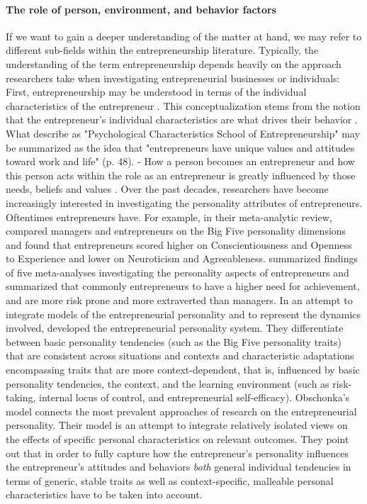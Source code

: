 \documentclass[a4paper,man,noextraspace,natbib]{apa6}
\begin{document}
\paragraph{The role of person, environment, and behavior factors}
If we want to gain a deeper understanding of the matter at hand, we may refer to different sub-fields within the entrepreneurship literature. 
Typically, the understanding of the term entrepreneurship depends heavily on the approach researchers take when investigating entrepreneurial businesses or individuals: 
First, entrepreneurship may be understood in terms of the individual characteristics of the entrepreneur \citep{Bird1988, Rauch2007, Obschonka2017}. 
This conceptualization stems from the notion that the entrepreneur's individual characteristics are what drives their behavior \citep{Cunningham1991}. 
What \cite{Cunningham1991} describe as "Psychological Characteristics School of Entrepreneurship" may be summarized as the idea that "entrepreneurs have unique values and attitudes toward work and life" (p. 48). 
- How a person becomes an entrepreneur and how this person acts within the role as an entrepreneur is greatly influenced by those needs, beliefs and values \cite[p.~48]{Cunningham1991}. 
Over the past decades, researchers have become increasingly interested in investigating the personality attributes of entrepreneurs. 
Oftentimes entrepreneurs have. For example, in their meta-analytic review, \cite{Zhao2006} compared managers and entrepreneurs on the Big Five personality dimensions and found that entrepreneurs scored higher on Conscientiousness and Openness to Experience and lower on Neuroticism and Agreeableness. 
\cite{Brandstatter2011} summarized findings of five meta-analyses investigating the personality aspects of entrepreneurs and summarized that commonly entrepreneurs to have a higher need for achievement, and are more risk prone and more extraverted than managers. 
In an attempt to integrate models of the entrepreneurial personality and to represent the dynamics involved, \cite{Obschonka2017} developed the entrepreneurial personality system. 
They differentiate between basic personality tendencies (such as the Big Five personality traits) that are consistent across situations and contexts and characteristic adaptations encompassing traits that are more context-dependent, that is, influenced by basic personality tendencies, the context, and the learning environment (such as risk-taking, internal locus of control, and entrepreneurial self-efficacy). 
Obschonka's \citeyearpar{Obschonka2017} model connects the most prevalent approaches of research on the entrepreneurial personality. 
Their model is an attempt to integrate relatively isolated views on the effects of specific personal characteristics on relevant outcomes. 
They point out that in order to fully capture how the entrepreneur's personality influences the entrepreneur's attitudes and behaviors \textit{both} general individual tendencies in terms of generic, stable traits as well as context-specific, malleable personal characteristics have to be taken into account. \par
\end{document}
